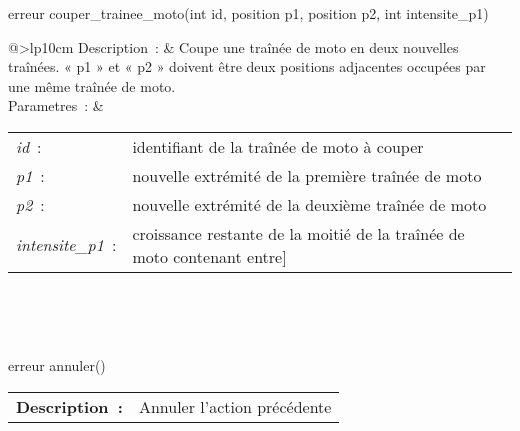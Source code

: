 \begin{minipage}{\linewidth}

\begin{lst-c++}
erreur couper_trainee_moto(int id, position p1, position p2, int intensite_p1)
\end{lst-c++}

\noindent
\begin{tabular}[t]{@{\extracolsep{0pt}}>{\bfseries}lp{10cm}}
Description~: & Coupe une traînée de moto en deux nouvelles traînées. « p1 » et « p2 » doivent être deux positions adjacentes occupées par une même traînée de moto. \\


Parametres~: &
\begin{tabular}[t]{@{\extracolsep{0pt}}ll}
    
    
      
        \textsl{id}~: & identifiant de la traînée de moto à couper \\
      
    
      
        \textsl{p1}~: & nouvelle extrémité de la première traînée de moto \\
      
    
      
        \textsl{p2}~: & nouvelle extrémité de la deuxième traînée de moto \\
      
    
      
        \textsl{intensite\_p1}~: & croissance restante de la moitié de la traînée de moto contenant entre] \\
      
    
  \end{tabular} \\






\end{tabular} \\[0.3cm]
\end{minipage}


\begin{minipage}{\linewidth}

\begin{lst-c++}
erreur annuler()
\end{lst-c++}

\noindent
\begin{tabular}[t]{@{\extracolsep{0pt}}>{\bfseries}lp{10cm}}
Description~: & Annuler l'action précédente \\







\end{tabular} \\[0.3cm]
\end{minipage}


